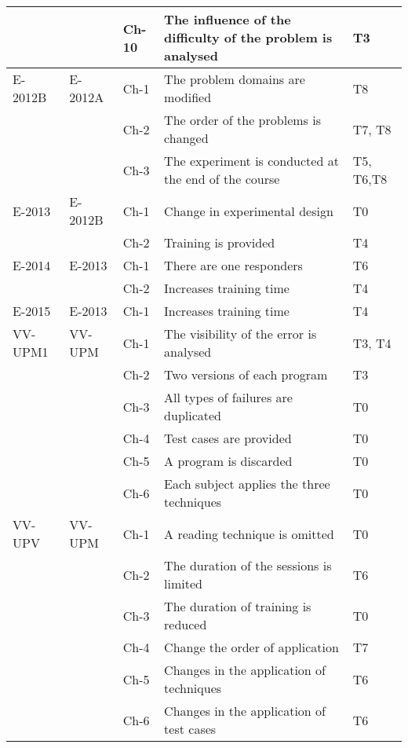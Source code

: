 \begin{table}
\begin{minipage}{6cm}
\begin{tabular}{| l | l | l |p{6cm} | p{1cm}|}
~ & ~ & Ch-10 &  The influence of the difficulty of the problem is analysed  & T3 \\ \hline
E-2012B & E-2012A & Ch-1 & The problem domains are modified & T8 \\
~ & ~ & Ch-2 &  The order of the problems is changed  & T7, T8 \\
~ & ~ & Ch-3 &  The experiment is conducted at the end of the course  & T5, T6,T8 \\ \hline
E-2013 & E-2012B & Ch-1 & Change in experimental design  & T0 \\
~ & ~ & Ch-2 &  Training is provided  & T4 \\ \hline
E-2014 & E-2013 & Ch-1 & There are one responders  & T6 \\
~ & ~ & Ch-2 &  Increases training time  & T4\\ \hline
E-2015 & E-2013 & Ch-1 & Increases training time  & T4 \\ 
\hline \hline
VV-UPM1 & VV-UPM & Ch-1 & The visibility of the error is analysed  & T3, T4 \\
~ & ~ & Ch-2 &  Two versions of each program  & T3 \\
~ & ~ & Ch-3 &  All types of failures are duplicated  & T0 \\
~ & ~ & Ch-4 &  Test cases are provided & T0 \\
~ & ~ & Ch-5 &  A program is discarded & T0 \\
~ & ~ & Ch-6 &  Each subject applies the three techniques & T0 \\ \hline
VV-UPV & VV-UPM & Ch-1 & A reading technique is omitted & T0 \\
~ & ~ & Ch-2 &  The duration of the sessions is limited & T6 \\
~ & ~ & Ch-3 &  The duration of training is reduced & T0 \\
~ & ~ & Ch-4 &  Change the order of application & T7 \\
~ & ~ & Ch-5 &  Changes in the application of techniques & T6 \\
~ & ~ & Ch-6 &  Changes in the application of test cases & T6 \\ \hline


\end{tabular}
\end{minipage}
\end{table}
